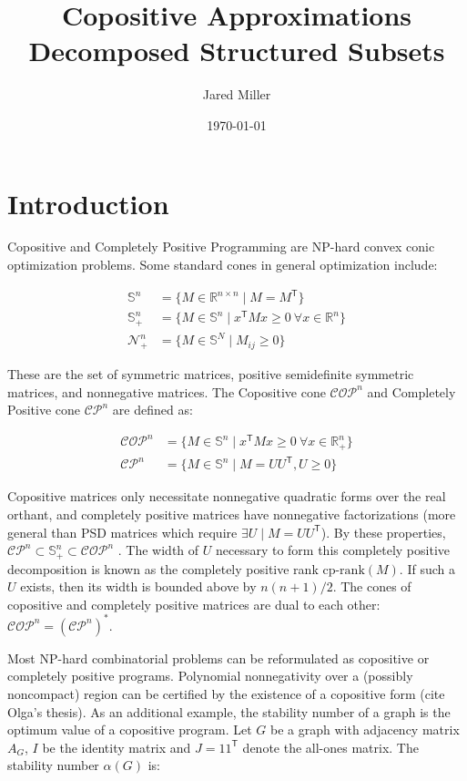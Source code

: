 \documentclass{article}
\title{Copositive Approximations Decomposed Structured Subsets}
\author{Jared Miller}
\date{\today}
\newcommand{\tr}{{\mathsf T}}
\newcommand{\R}{\mathbb{R}}
\newcommand{\psd}{\mathbb{S}}
\newcommand{\N}{\mathcal{N}}
\newcommand{\cp}{\mathcal{C}\mathcal{P}}
\newcommand{\cop}{\mathcal{C}\mathcal{O}\mathcal{P}}
\begin{document}
\maketitle

\section{Introduction}

\maketitle


Copositive and Completely Positive Programming are NP-hard convex conic optimization problems. Some standard cones in  general optimization include:

\begin{align*}
    \psd^n &= \{M \in \R^{n \times n} \mid M = M^{\tr}\} \\
    \psd_+^n &= \{M \in \psd^n \mid x^{\tr} M x \geq 0 \ \forall x \in \R^n\} \\
    \N_+^n &= \{M \in \psd^N \mid M_{ij} \geq 0\}
\end{align*}

These are the set of symmetric matrices, positive semidefinite symmetric matrices, and nonnegative matrices. The Copositive cone $\cop^n$ and Completely Positive cone $\cp^n$ are defined as:

\begin{align*}
    \cop^n &= \{M \in \psd^n \mid x^{\tr} M x \geq 0 \ \forall x \in \R^n_+\} \\
    \cp^n &= \{M \in \psd^n \mid M = U U^{\tr}, U \geq 0 \}
\end{align*}

Copositive matrices only necessitate nonnegative quadratic forms over the real orthant, and completely positive matrices have nonnegative factorizations (more general than PSD matrices which require  $\exists U \mid M = U U^{\tr}$). By these properties, $\cp^n \subset \psd_+^n \subset \cop^n$ \cite{berman2003completely}. The width of $U$ necessary to form this completely positive decomposition is known as the completely positive rank $\text{cp-rank}(M)$. If such a $U$ exists, then its width is bounded above by $n(n+1)/2$. The cones of copositive and completely positive matrices are dual to each other: $\cop^n = (\cp^n)^*$.

Most NP-hard combinatorial problems can be reformulated as copositive or completely positive programs. Polynomial nonnegativity over a (possibly noncompact) region can be certified by the existence of a copositive form (cite Olga's thesis). As an additional example, the stability number of a graph is the optimum value of a copositive program. Let $G$ be a graph with adjacency matrix $A_G$, $I$ be the identity matrix and $J = 1 1^{\tr}$ denote the all-ones matrix. The stability number $\alpha(G)$ is:
\end{document}
